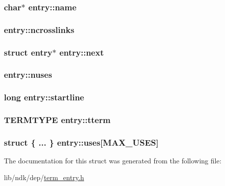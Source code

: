 \hypertarget{structentry_aef8962564a1a313a7ddc320bb4ed739c}{
\subsubsection[{name}]{\setlength{\rightskip}{0pt plus 5cm}char$\ast$ entry\-::name}}\label{structentry_aef8962564a1a313a7ddc320bb4ed739c}
\hypertarget{structentry_a86bb80a62128828458c0383fa1ee4725}{
\subsubsection[{ncrosslinks}]{ entry\-::ncrosslinks}}\label{structentry_a86bb80a62128828458c0383fa1ee4725}
\hypertarget{structentry_a6ba6b7d14932763dcb0df242b5ff2dfd}{
\subsubsection[{next}]{\setlength{\rightskip}{0pt plus 5cm}struct {\bf entry}$\ast$ entry\-::next}}\label{structentry_a6ba6b7d14932763dcb0df242b5ff2dfd}
\hypertarget{structentry_a7c062d016b6006a4d3bb116a8c666979}{
\subsubsection[{nuses}]{ entry\-::nuses}}\label{structentry_a7c062d016b6006a4d3bb116a8c666979}
\hypertarget{structentry_abe330cabf8e854d92a05f5406d8d4bd8}{
\subsubsection[{startline}]{\setlength{\rightskip}{0pt plus 5cm}long entry\-::startline}}\label{structentry_abe330cabf8e854d92a05f5406d8d4bd8}
\hypertarget{structentry_acd8b278ac1cb8f1c978f181d04005635}{
\subsubsection[{tterm}]{\setlength{\rightskip}{0pt plus 5cm}T\-E\-R\-M\-T\-Y\-P\-E entry\-::tterm}}\label{structentry_acd8b278ac1cb8f1c978f181d04005635}
\hypertarget{structentry_a76c5a573e90efbfe635b829d637286bb}{
\subsubsection[{uses}]{\setlength{\rightskip}{0pt plus 5cm}struct \{ ... \}   entry\-::uses\mbox{[}{\bf M\-A\-X\-\_\-\-U\-S\-E\-S}\mbox{]}}}\label{structentry_a76c5a573e90efbfe635b829d637286bb}


The documentation for this struct was generated from the following file\-:\begin{DoxyCompactItemize}
\item 
lib/ndk/dep/\hyperlink{term__entry_8h}{term\-\_\-entry.\-h}\end{DoxyCompactItemize}
